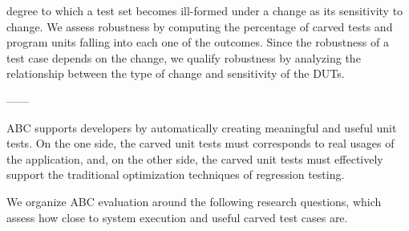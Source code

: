 \documentclass[10pt,conference]{IEEEtran}
\newcommand{\abc}{\textsf{ABC}\xspace}
\begin{document}
degree to which a test set becomes ill-formed under a change as its sensitivity to change. We assess robustness by computing the percentage of carved tests and program units falling into each one of the outcomes. Since the robustness of a test case depends on the change, we qualify robustness by analyzing the relationship between the type of change and sensitivity of the DUTs.

------

\abc supports developers by automatically creating meaningful and useful unit tests.
On the one side, the carved unit tests must corresponds to real usages of the application, and,
on the other side, the carved unit tests must effectively support the traditional
optimization techniques of regression testing.

We organize \abc evaluation around the following research questions, which assess how close
to system execution and useful carved test cases are.

\newenvironment{RQ}[1][]{\refstepcounter{RQ}\par\noindent
   \textbf{RQ\theRQ. #1} \rmfamily}{}
\end{document}

